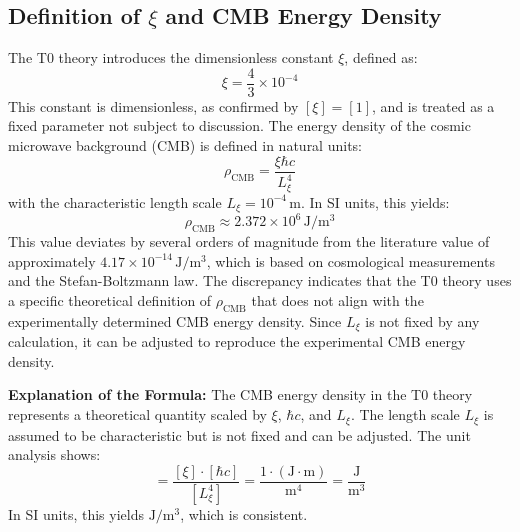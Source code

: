 \documentclass{article}
\begin{document}
	\subsection{Definition of $\xi$ and CMB Energy Density}
	The T0 theory introduces the dimensionless constant $\xi$, defined as:
	\begin{equation}
		\xi = \frac{4}{3} \times 10^{-4}
	\end{equation}
	This constant is dimensionless, as confirmed by $[\xi] = [1]$, and is treated as a fixed parameter not subject to discussion. The energy density of the cosmic microwave background (CMB) is defined in natural units:
	\begin{equation}
		\rho_{\text{CMB}} = \frac{\xi \hbar c}{L_\xi^4}
	\end{equation}
	with the characteristic length scale $L_\xi = 10^{-4} \, \text{m}$. In SI units, this yields:
	\begin{equation}
		\rho_{\text{CMB}} \approx 2.372 \times 10^6 \, \text{J}/\text{m}^3
	\end{equation}
	This value deviates by several orders of magnitude from the literature value of approximately $4.17 \times 10^{-14} \, \text{J}/\text{m}^3$, which is based on cosmological measurements and the Stefan-Boltzmann law. The discrepancy indicates that the T0 theory uses a specific theoretical definition of $\rho_{\text{CMB}}$ that does not align with the experimentally determined CMB energy density. Since $L_\xi$ is not fixed by any calculation, it can be adjusted to reproduce the experimental CMB energy density.
	
	\textbf{Explanation of the Formula:} The CMB energy density in the T0 theory represents a theoretical quantity scaled by $\xi$, $\hbar c$, and $L_\xi$. The length scale $L_\xi$ is assumed to be characteristic but is not fixed and can be adjusted. The unit analysis shows:
	\begin{equation}
		[\rho_{\text{CMB}}] = \frac{[\xi] \cdot [\hbar c]}{[L_\xi^4]} = \frac{1 \cdot (\text{J} \cdot \text{m})}{\text{m}^4} = \frac{\text{J}}{\text{m}^3}
	\end{equation}
	In SI units, this yields $\text{J}/\text{m}^3$, which is consistent.
	
\end{document}
